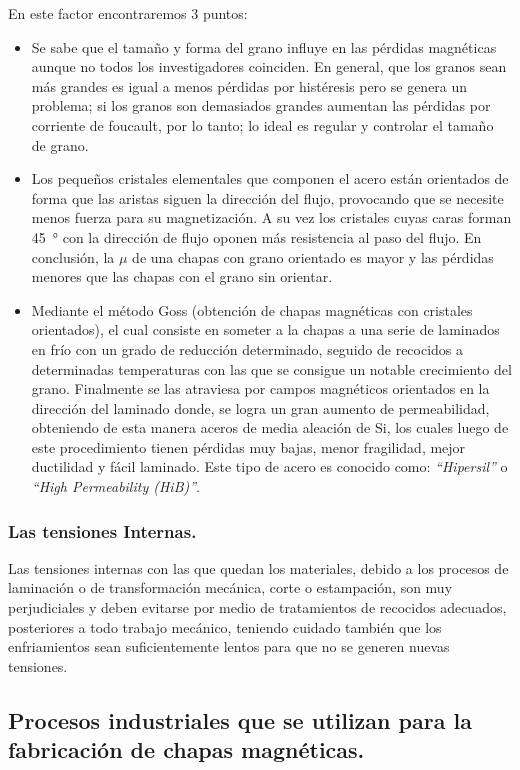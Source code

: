 \documentclass[12pt,a4paper]{article}
\begin{document}
En este factor encontraremos 3 puntos:
\begin{itemize}
    \item Se sabe que el tamaño y forma del grano influye en las pérdidas magnéticas aunque no todos los investigadores coinciden. En general, que los granos sean más grandes es igual a menos pérdidas por histéresis pero se genera un problema; si los granos son demasiados grandes aumentan las pérdidas por corriente de foucault, por lo tanto; lo ideal es regular y controlar el tamaño de grano.
    \item Los pequeños cristales elementales que componen el acero están orientados de forma que las aristas siguen la dirección del flujo, provocando que se necesite menos fuerza para su magnetización. A su vez los cristales cuyas caras forman \SI{45}{\degree} con la dirección de flujo oponen más resistencia al paso del flujo. En conclusión, la $\mu$ de una chapas con grano orientado es mayor y las pérdidas menores que las chapas con el grano sin orientar.
    \item Mediante el método Goss (obtención de chapas magnéticas con cristales orientados), el cual consiste en someter a la chapas a una serie de laminados en frío con un grado de reducción determinado, seguido de recocidos a determinadas temperaturas con las que se consigue un notable crecimiento del grano. Finalmente se las atraviesa por campos magnéticos orientados en la dirección del laminado donde, se logra un gran aumento de permeabilidad, obteniendo de esta manera aceros de media aleación de Si, los cuales luego de este procedimiento tienen pérdidas muy bajas, menor fragilidad, mejor ductilidad y fácil laminado. Este tipo de acero es conocido como: \textit{\enquote{Hipersil}} o \textit{\enquote{High Permeability (HiB)}}.
\end{itemize}

\subsubsection{Las tensiones Internas.}

Las tensiones internas con las que quedan los materiales, debido a los procesos de laminación o de transformación mecánica, corte o estampación, son muy perjudiciales y deben evitarse por medio de tratamientos de recocidos adecuados, posteriores a todo trabajo mecánico, teniendo cuidado también que los enfriamientos sean suficientemente lentos para que no se generen nuevas tensiones.

\subsection{Procesos industriales que se utilizan para la fabricación de chapas magnéticas.}
\end{document}

